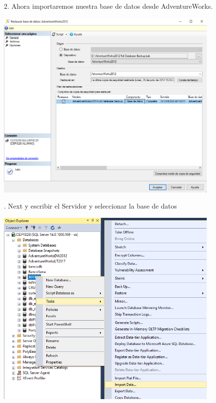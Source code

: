 2. Ahora importaremos nuestra base de datos desde AdventureWorks.\\
	\begin{center}
	\includegraphics[width=11cm]{./Imagenes/img2}
	\end{center}	
. Next y escribir el Servidor y seleccionar la base de datos\\
	\begin{center}
	\includegraphics[width=11cm]{./Imagenes/img3}
	\end{center}	

